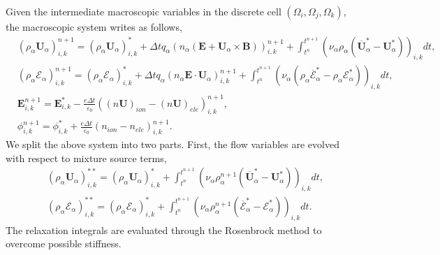 \documentclass[preprint,3p,12pt,sort&compress]{elsarticle}
\begin{document}
Given the intermediate macroscopic variables in the discrete cell $(\Omega_{i}, \Omega_{j}, \Omega_{k})$, the macroscopic system writes as follows,
\begin{equation}
\begin{aligned}
& (\rho_\alpha \mathbf U_\alpha)^{n+1}_{i,k} = (\rho_\alpha \mathbf U_\alpha)^{*}_{i,k}
+ \Delta t q_\alpha \left( n_\alpha (\mathbf E+\mathbf U_\alpha \times \mathbf B) \right)_{i,k}^{n+1} 
+\int_{t^n}^{t^{n+1}} \left( \nu_{\alpha}\rho_{\alpha} ( \overline{\mathbf{U}}^*_{\alpha}- \mathbf{U}^*_{\alpha}) \right)_{i,k} dt, \\
& (\rho_\alpha \mathscr E_\alpha)_{i,k}^{n+1}  = (\rho_\alpha \mathscr E_\alpha)_{i,k}^{*}
+ \Delta t q_\alpha (n_\alpha \mathbf E \cdot \mathbf U_\alpha)_{i,k}^{n+1}
+ \int_{t^n}^{t^{n+1}} \left( \nu_{\alpha} (\rho_{\alpha} \overline{\mathscr{E}}^*_{\alpha} -\rho_{\alpha} \mathscr{E}^*_{\alpha} ) \right)_{i,k} dt, \\
&{\mathbf{E}}_{i,k}^{n+1}={\mathbf{E}}_{i,k}^{*}
-\frac{e \Delta t}{\varepsilon_0}\left( {( n \mathbf U)}_{ion} - {( n \mathbf U)}_{ele} \right)^{n+1}_{i,k}, \\
&{{\phi}}_{i,k}^{n+1}={{\phi}}_{i,k}^{*} 
+\frac{e \Delta t}{\varepsilon_0}\left({n}_{ion}-{n}_{ele} \right)^{n+1}_{i,k} .
\end{aligned}
\label{eqn:macro source}
\end{equation}
We split the above system into two parts.
First, the flow variables are evolved with respect to mixture source terms,
\begin{equation}
\begin{aligned}
& (\rho_\alpha \mathbf U_\alpha)^{**}_{i,k} = (\rho_\alpha \mathbf U_\alpha)^{*}_{i,k}
+\int_{t^n}^{t^{n+1}} \left( \nu_{\alpha}\rho^{n+1}_{\alpha} ( \overline{\mathbf{U}}^*_{\alpha}- \mathbf{U}^*_{\alpha}) \right)_{i,k} dt, \\
& (\rho_\alpha \mathscr E_\alpha)_{i,k}^{**}  = (\rho_\alpha \mathscr E_\alpha)_{i,k}^{*}
+ \int_{t^n}^{t^{n+1}} \left( \nu_{\alpha}\rho_{\alpha}^{n+1} \left( \overline{\mathscr{E}}_{\alpha}^{*}- \mathscr{E}_{\alpha}^* \right) \right)_{i,k} dt .
\end{aligned}
\end{equation}
The relaxation integrals are evaluated through the Rosenbrock method \cite{shampine1982implementation} to overcome possible stiffness.
\end{document}
